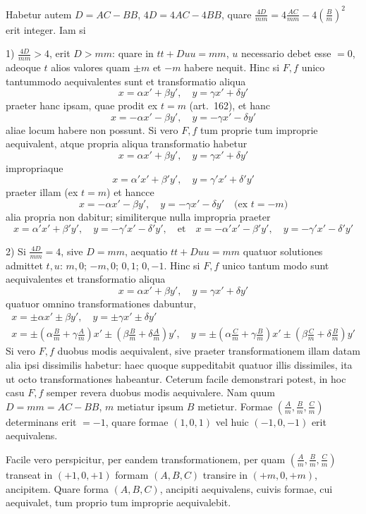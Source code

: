 \documentclass[12pt,a4paper]{article}
\theoremstyle{plain}
\theoremstyle{definition}
\theoremstyle{remark}
\begin{document}
Habetur autem $D=AC-BB$, $4D=4AC-4BB$, quare $\frac{4D}{mm}=4\frac{AC}{mm}-4(\frac{B}{m})^2$ erit integer. Iam si

1) $\frac{4D}{mm}>4$, erit $D>mm$: quare in $tt+Duu=mm$, $u$ necessario debet esse $=0$, adeoque $t$ alios valores quam $\pm m$ et $-m$ habere nequit. Hinc si $F,f$ unico tantummodo aequivalentes sunt et transformatio aliqua
\[x=\alpha x'+\beta y',\quad y=\gamma x'+\delta y'\]
praeter hanc ipsam, quae prodit ex $t=m$ (art.\ 162), et hanc
\[x=-\alpha x'-\beta y',\quad y=-\gamma x'-\delta y'\]
aliae locum habere non possunt. Si vero $F,f$ tum proprie tum improprie aequivalent, atque propria aliqua transformatio habetur
\[x=\alpha x'+\beta y',\quad y=\gamma x'+\delta y'\]
impropriaque
\[x=\alpha'x'+\beta'y',\quad y=\gamma'x'+\delta'y'\]
praeter illam (ex $t=m$) et hancce
\[x=-\alpha x'-\beta y',\quad y=-\gamma x'-\delta y'\quad\text{(ex }t=-m\text{)}\]
alia propria non dabitur; similiterque nulla impropria praeter
\[x=\alpha'x'+\beta'y',\quad y=-\gamma'x'-\delta'y',\quad\text{et}\quad x=-\alpha'x'-\beta'y',\quad y=-\gamma'x'-\delta'y'\]

2) Si $\frac{4D}{mm}=4$, sive $D=mm$, aequatio $tt+Duu=mm$ quatuor solutiones admittet $t,u$: $m,0$; $-m,0$; $0,1$; $0,-1$. Hinc si $F,f$ unico tantum modo sunt aequivalentes et transformatio aliqua
\[x=\alpha x'+\beta y',\quad y=\gamma x'+\delta y'\]
quatuor omnino transformationes dabuntur,
\begin{gather*}
x=\pm\alpha x'\pm\beta y',\quad y=\pm\gamma x'\pm\delta y'\\
x=\pm(\alpha\frac{B}{m}+\gamma\frac{A}{m})x'\pm(\beta\frac{B}{m}+\delta\frac{A}{m})y',\quad
y=\pm(\alpha\frac{C}{m}+\gamma\frac{B}{m})x'\pm(\beta\frac{C}{m}+\delta\frac{B}{m})y'
\end{gather*}
Si vero $F,f$ duobus modis aequivalent, sive praeter transformationem illam datam alia ipsi dissimilis habetur: haec quoque suppeditabit quatuor illis dissimiles, ita ut octo transformationes habeantur. Ceterum facile demonstrari potest, in hoc casu $F,f$ semper revera duobus modis aequivalere. Nam quum $D=mm=AC-BB$, $m$ metiatur ipsum $B$ metietur. Formae $(\frac{A}{m},\frac{B}{m},\frac{C}{m})$ determinans erit $=-1$, quare formae $(1,0,1)$ vel huic $(-1,0,-1)$ erit aequivalens.

Facile vero perspicitur, per eandem transformationem, per quam $(\frac{A}{m},\frac{B}{m},\frac{C}{m})$ transeat in $(+1,0,+1)$ formam $(A,B,C)$ transire in $(+m,0,+m)$, ancipitem. Quare forma $(A,B,C)$, ancipiti aequivalens, cuivis formae, cui aequivalet, tum proprio tum improprie aequivalebit.
\end{document}
